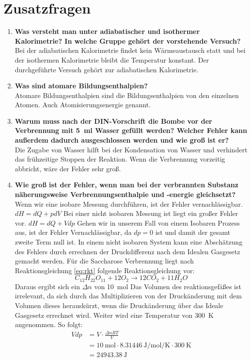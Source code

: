 \section{Zusatzfragen}
	\begin{enumerate}
		\item \textbf{ Was versteht man unter adiabatischer und isothermer Kalorimetrie? In welche Gruppe gehört der  vorstehende Versuch?} \\
		Bei der adiabatischen Kalorimetrie findet kein Wärmeaustausch statt und bei der isothermen Kalorimetrie bleibt die Temperatur konstant. 
		Der durchgeführte Versuch gehört zur adiabatischen Kalorimetrie.	
		\item \textbf{ Was sind atomare Bildungsenthalpien?}\\
		Atomare Bildungsenthalpien sind die Bildungsenthalpien von den einzelnen Atomen. Auch Atomisierungsenergie genannt.
		\item \textbf{ Warum muss nach der DIN-Vorschrift die Bombe vor der Verbrennung mit 5\ ml Wasser gefüllt werden? Welcher Fehler kann außerdem dadurch ausgeschlossen werden und wie groß ist er?}\\
		Die Zugabe von Wasser hilft bei der Kondensation von Wasser und verhindert das frühzeitige Stoppen der Reaktion. Wenn die Verbrennung vorzeitig abbricht, wäre der Fehler sehr groß.   
		\item  \textbf{ Wie groß ist der Fehler, wenn man bei der verbrannten Substanz näherungsweise Verbrennungsenthalpie und -energie gleichsetzt?}\\
		Wenn wir eine isobare Messung durchführen, ist der Fehler vernachlässigbar.
		$dH = dQ + pdV$
		Bei einer nicht isobaren Messung ist liegt ein großer Fehler vor.
		$dH = dQ + Vdp$
		Gehen wir in unserem Fall von einem Isobaren Prozess aus, ist der Fehler Vernachlässigbar, da $dp=0$ ist und damit der gesamt zweite Term null ist.
		In einem nicht isobaren System kann eine Abschätzung des Fehlers durch errechnen der Druckdifferenz nach dem Idealen Gasgesetz gemacht werden.
		Für die Saccharose Verbrennung liegt nach Reaktionsgleichung \ref{eq:rkt} folgende Reaktionsgleichung vor:
		$$ C_{12}H_{22}O_{11} + 12O_2 \rightarrow 12CO_2 + 11H_2O $$
		Daraus ergibt sich ein $\Delta n$ von \qty{10}{\mole}
		Das Volumen des reaktionsgefäßes ist irrelevant, da sich durch das Multiplizieren von der Druckänderung mit dem Volumen dieses herauskürzt, wenn die Druckänderung über das Ideale Gasgesetz errechnet wird.
		Weiter wird eine Temperatur von \qty{300}{\kelvin} angenommen.
		So folgt:
		\begin{align*}
			Vdp &= V\cdot\frac{\Delta nRT}{V}\\
			&= \qty{10}{\mole}\cdot\qty{8,31446}{\joule\per\mole\per\kelvin}\cdot\qty{300}{\kelvin} \\
			&= \qty{24943,38}{\joule}
		\end{align*}	
		$$ $$
	\end{enumerate}
